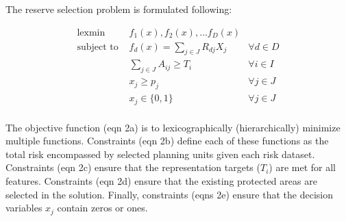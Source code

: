 \documentclass[
  11pt,
]{article}
\begin{document}
The reserve selection problem is formulated following:

\begin{align*}
\text{lexmin } & f_1(x), f_2(x), \ldots f_D(x) & \tag{eqn 2a} \\
\text{subject to } & f_d(x) = \sum_{j \in J} R_{dj} X_j & \forall d \in D \tag{eqn 2b} \\
& \sum_{j \in J} A_{ij} \geq T_i & \forall i \in I \tag{eqn 2c} \\
& x_j \geq p_j & \forall j \in J \tag{eqn2d} \\
& x_j \in \{ 0, 1 \} & \forall j \in J \tag{eqn 2e} \\
\end{align*}

The objective function (eqn 2a) is to lexicographically (hierarchically)
minimize multiple functions. Constraints (eqn 2b) define each of these
functions as the total risk encompassed by selected planning units given
each risk dataset. Constraints (eqn 2c) ensure that the representation
targets (\(T_i\)) are met for all features. Constraints (eqn 2d) ensure
that the existing protected areas are selected in the solution. Finally,
constraints (eqns 2e) ensure that the decision variables \(x_j\) contain
zeros or ones.
\end{document}
